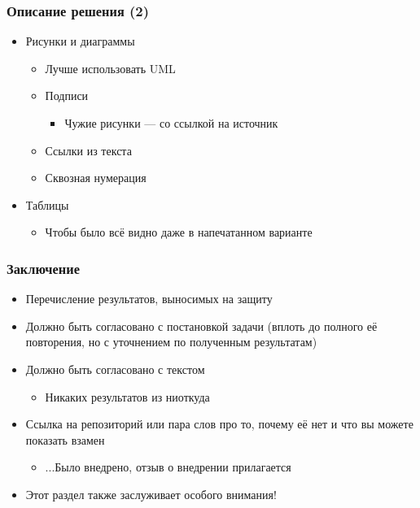 \documentclass[xetex,mathserif,serif]{beamer}
\begin{document}
    \begin{frame}
        \frametitle{Описание решения (2)}
        \begin{itemize}
            \item Рисунки и диаграммы
            \begin{itemize}
                \item Лучше использовать UML
                \item Подписи
                \begin{itemize}
                    \item Чужие рисунки --- со ссылкой на источник
                \end{itemize}
                \item Ссылки из текста
                \item Сквозная нумерация
            \end{itemize}
            \item Таблицы
            \begin{itemize}
                \item Чтобы было всё видно даже в напечатанном варианте
            \end{itemize}
        \end{itemize}
    \end{frame}

    \begin{frame}
        \frametitle{Заключение}
        \begin{itemize}
            \item Перечисление результатов, выносимых на защиту
            \item Должно быть согласовано с постановкой задачи (вплоть до полного её повторения, но с уточнением по полученным результатам)
            \item Должно быть согласовано с текстом
            \begin{itemize}
                \item Никаких результатов из ниоткуда
            \end{itemize}
            \item Ссылка на репозиторий или пара слов про то, почему её нет и что вы можете показать взамен
            \begin{itemize}
                \item ...Было внедрено, отзыв о внедрении прилагается
            \end{itemize}
            \item Этот раздел также заслуживает особого внимания!
        \end{itemize}
    \end{frame}
\end{document}
